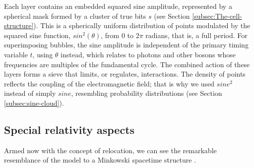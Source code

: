 \documentclass[12pt,english]{article}
\begin{document}
Each layer contains an embedded squared sine amplitude, represented by a spherical mask formed by a cluster of true bits $s$  (see Section \ref{subsec:The-cell-structure}). This is a spherically uniform distribution of points modulated by the squared sine function, $sin^2(\theta)$, from $0$ to $2\pi$ radians, that is, a full period. For superimposing bubbles, the sine amplitude is independent of the primary timing variable \( t \), using $\theta$ instead, which relates to photons and other bosons whose frequencies are multiples of the fundamental cycle. The combined action of these layers forms a sieve that limits, or regulates, interactions. The density of points reflects the coupling of the electromagnetic field; that is why we used $sine^2$ instead of simply $sine$, resembling probability distributions (see Section \ref{subsec:sine-cloud}).

\subsection{Special relativity aspects} \label{subsec:special-rel}

Armed now with the concept of relocation, we can see the remarkable resemblance of the model to a Minkowski spacetime structure \cite{minkowski1909space,rindler2006relativity}.
\end{document}
